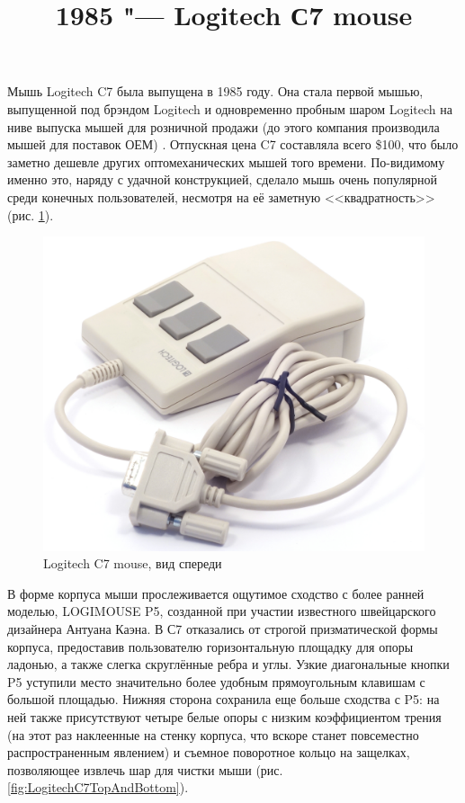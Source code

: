 \documentclass[11pt, a4paper]{article}
\begin{document}
\title{1985 "--- Logitech С7 mouse}
\date{}
\maketitle
{}
Мышь Logitech C7 была выпущена в 1985 году. Она стала первой мышью, выпущенной под брэндом Logitech \cite{timeline} и одновременно пробным шаром Logitech на ниве выпуска мышей для розничной продажи (до этого компания производила мышей для поставок ОЕМ) \cite{history}. Отпускная цена C7 составляла всего \$100, что было заметно дешевле других оптомеханических мышей того времени. По-видимому именно это, наряду с удачной конструкцией, сделало мышь очень популярной среди конечных пользователей, несмотря на её заметную <<квадратность>> (рис. \ref{fig:LogitechC7Pic}).

\begin{figure}[h]
   \centering
    \includegraphics[scale=0.45]{1985_logitech_c7_mouse/pic_60.jpg}
    \caption{Logitech C7 mouse, вид спереди}
    \label{fig:LogitechC7Pic}
\end{figure}

В форме корпуса мыши прослеживается ощутимое сходство с более ранней моделью, LOGIMOUSE P5, созданной при участии известного швейцарского дизайнера Антуана Каэна. В С7 отказались от строгой призматической формы корпуса, предоставив пользователю горизонтальную площадку для опоры ладонью, а также слегка скруглённые ребра и углы. Узкие диагональные кнопки P5 уступили место значительно более удобным прямоугольным клавишам с большой площадью. Нижняя сторона сохранила еще больше сходства с P5: на ней также присутствуют четыре белые опоры с низким коэффициентом трения (на этот раз наклеенные на стенку корпуса, что вскоре станет повсеместно распространенным явлением) и съемное поворотное кольцо на защелках, позволяющее извлечь шар для чистки мыши (рис. \ref{fig:LogitechC7TopAndBottom}).
\end{document}
